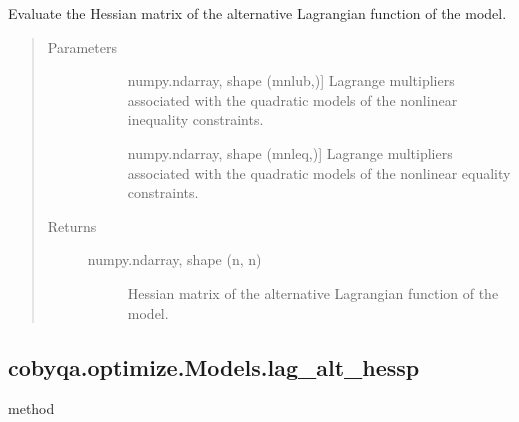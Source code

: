 \documentclass[letterpaper,10pt,english]{sphinxmanual}
\begin{document}
\begin{fulllineitems}
\begin{fulllineitems}
\label{\detokenize{refs/generated/cobyqa.optimize.Models.lag_alt_hess:cobyqa.optimize.Models.lag_alt_hess}}
\sphinxAtStartPar
Evaluate the Hessian matrix of the alternative Lagrangian function of
the model.
\begin{quote}\begin{description}
\item[{Parameters}] \leavevmode\begin{description}
\item[{}] \leavevmode{[}numpy.ndarray, shape (mnlub,){]}
\sphinxAtStartPar
Lagrange multipliers associated with the quadratic models of the
nonlinear inequality constraints.

\item[{}] \leavevmode{[}numpy.ndarray, shape (mnleq,){]}
\sphinxAtStartPar
Lagrange multipliers associated with the quadratic models of the
nonlinear equality constraints.

\end{description}

\item[{Returns}] \leavevmode\begin{description}
\item[{numpy.ndarray, shape (n, n)}] \leavevmode
\sphinxAtStartPar
Hessian matrix of the alternative Lagrangian function of the model.

\end{description}

\end{description}\end{quote}

\end{fulllineitems}



\subsection{cobyqa.optimize.Models.lag\_alt\_hessp}
\label{\detokenize{refs/generated/cobyqa.optimize.Models.lag_alt_hessp:cobyqa-optimize-models-lag-alt-hessp}}\label{\detokenize{refs/generated/cobyqa.optimize.Models.lag_alt_hessp::doc}}
\sphinxAtStartPar
method


\end{fulllineitems}
\end{document}
